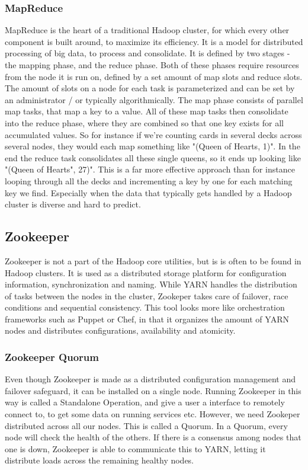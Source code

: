 \documentclass[a4paper,english]{report}
\begin{document}
		\subsubsection{MapReduce}
		MapReduce is the heart of a traditional Hadoop cluster, for which every other component is built around, to maximize its efficiency. It is a model for distributed processing of big data, to process and consolidate. It is defined by two stages - the mapping phase, and the reduce phase. Both of these phases require resources from the node it is run on, defined by a set amount of map slots and reduce slots. The amount of slots on a node for each task is parameterized and can be set by an administrator / or typically algorithmically. The map phase consists of parallel map tasks, that map a key to a value. All of these map tasks then consolidate into the reduce phase, where they are combined so that one key exists for all accumulated values. So for instance if we're counting cards in several decks across several nodes, they would each map something like "(Queen of Hearts, 1)". In the end the reduce task consolidates all these single queens, so it ends up looking like "(Queen of Hearts", 27)". This is a far more effective approach than for instance looping through all the decks and incrementing a key by one for each matching key we find. Especially when the data that typically gets handled by a Hadoop cluster is diverse and hard to predict.
		
		\subsection{Zookeeper}
		Zookeeper is not a part of the Hadoop core utilities, but is is often to be found in Hadoop clusters. It is used as a distributed storage platform for configuration information, synchronization and naming. While YARN handles the distribution of tasks between the nodes in the cluster, Zookeper takes care of failover, race conditions and sequential consistency. This tool looks more like orchestration frameworks such as Puppet or Chef, in that it organizes the amount of YARN nodes and distributes configurations, availability and atomicity.
		
		\subsubsection{Zookeeper Quorum}
		Even though Zookeeper is made as a distributed configuration management and failover safeguard, it can be installed on a single node. Running Zookeeper in this way is called a Standalone Operation, and give a user a interface to remotely connect to, to get some data on running services etc. However, we need Zookeper distributed across all our nodes. This is called a Quorum. In a Quorum, every node will check the health of the others. If there is a consensus among nodes that one is down, Zookeeper is able to communicate this to YARN, letting it distribute loads across the remaining healthy nodes. 
		
\end{document}
